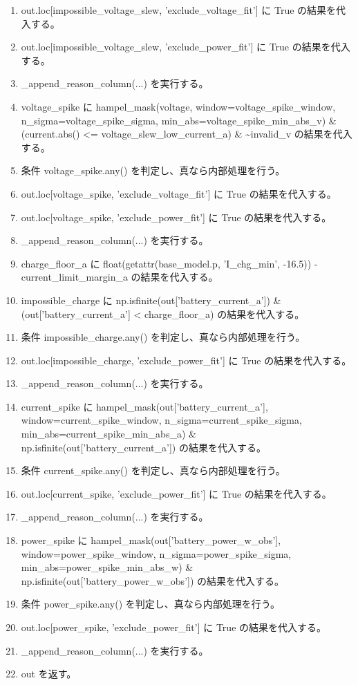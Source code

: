 \documentclass[a4paper,11pt]{article}
\begin{document}
\begin{enumerate}[leftmargin=1.8em]
\item   out.loc[impossible\_voltage\_slew, 'exclude\_voltage\_fit'] に True の結果を代入する。
\item   out.loc[impossible\_voltage\_slew, 'exclude\_power\_fit'] に True の結果を代入する。
\item   \_append\_reason\_column(...) を実行する。
\item voltage\_spike に hampel\_mask(voltage, window=voltage\_spike\_window, n\_sigma=voltage\_spike\_sigma, min\_abs=voltage\_spike\_min\_abs\_v) \& (current.abs() <= voltage\_slew\_low\_current\_a) \& \textasciitilde{}invalid\_v の結果を代入する。
\item 条件 voltage\_spike.any() を判定し、真なら内部処理を行う。
\item   out.loc[voltage\_spike, 'exclude\_voltage\_fit'] に True の結果を代入する。
\item   out.loc[voltage\_spike, 'exclude\_power\_fit'] に True の結果を代入する。
\item   \_append\_reason\_column(...) を実行する。
\item charge\_floor\_a に float(getattr(base\_model.p, 'I\_chg\_min', -16.5)) - current\_limit\_margin\_a の結果を代入する。
\item impossible\_charge に np.isfinite(out['battery\_current\_a']) \& (out['battery\_current\_a'] < charge\_floor\_a) の結果を代入する。
\item 条件 impossible\_charge.any() を判定し、真なら内部処理を行う。
\item   out.loc[impossible\_charge, 'exclude\_power\_fit'] に True の結果を代入する。
\item   \_append\_reason\_column(...) を実行する。
\item current\_spike に hampel\_mask(out['battery\_current\_a'], window=current\_spike\_window, n\_sigma=current\_spike\_sigma, min\_abs=current\_spike\_min\_abs\_a) \& np.isfinite(out['battery\_current\_a']) の結果を代入する。
\item 条件 current\_spike.any() を判定し、真なら内部処理を行う。
\item   out.loc[current\_spike, 'exclude\_power\_fit'] に True の結果を代入する。
\item   \_append\_reason\_column(...) を実行する。
\item power\_spike に hampel\_mask(out['battery\_power\_w\_obs'], window=power\_spike\_window, n\_sigma=power\_spike\_sigma, min\_abs=power\_spike\_min\_abs\_w) \& np.isfinite(out['battery\_power\_w\_obs']) の結果を代入する。
\item 条件 power\_spike.any() を判定し、真なら内部処理を行う。
\item   out.loc[power\_spike, 'exclude\_power\_fit'] に True の結果を代入する。
\item   \_append\_reason\_column(...) を実行する。
\item out を返す。
            \end{enumerate}
\end{document}
